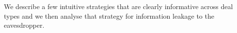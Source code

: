 \documentclass{article}
\begin{document}
We describe a few intuitive strategies
that are clearly informative across deal
types and we then analyse that strategy for
information leakage to the eavesdropper.




\newpage
\appendix

\end{document}
